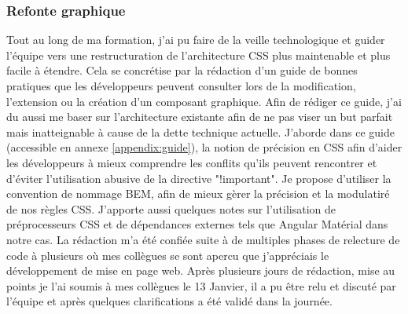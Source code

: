 \documentclass[12pt, a4paper]{report}
\newcommand\tab[1][1cm]{\hspace*{#1}}
\begin{document}
\subsubsection{Refonte graphique}
\tab{}Tout au long de ma formation, j'ai pu faire de la veille technologique et guider l'équipe vers une restructuration de l'architecture CSS plus maintenable et plus facile à étendre.\newline
Cela se concrétise par la rédaction d'un guide de bonnes pratiques que les développeurs peuvent consulter lors de la modification, l'extension ou la création d'un composant graphique.
Afin de rédiger ce guide, j'ai du aussi me baser sur l'architecture existante afin de ne pas viser un but parfait mais inatteignable à cause de la dette technique actuelle.\newline
J'aborde dans ce guide (accessible en annexe \ref{appendix:guide}), la notion de précision en CSS afin d'aider les développeurs à mieux comprendre les conflits qu'ils peuvent rencontrer et d'éviter l'utilisation abusive de la directive "!important". Je propose d'utiliser la convention de nommage BEM, afin de mieux gèrer la précision et la modulatiré de nos règles CSS. J'apporte aussi quelques notes sur l'utilisation de préprocesseurs CSS et de dépendances externes tels que Angular Matérial dans notre cas.\newline
La rédaction m'a été confiée suite à de multiples phases de relecture de code à plusieurs où mes collègues se sont apercu que j'appréciais le développement de mise en page web. Après plusieurs jours de rédaction, mise au points je l'ai soumis à mes collègues le 13 Janvier, il a pu être relu et discuté par l'équipe et après quelques clarifications a été validé dans la journée.\newline
\end{document}
